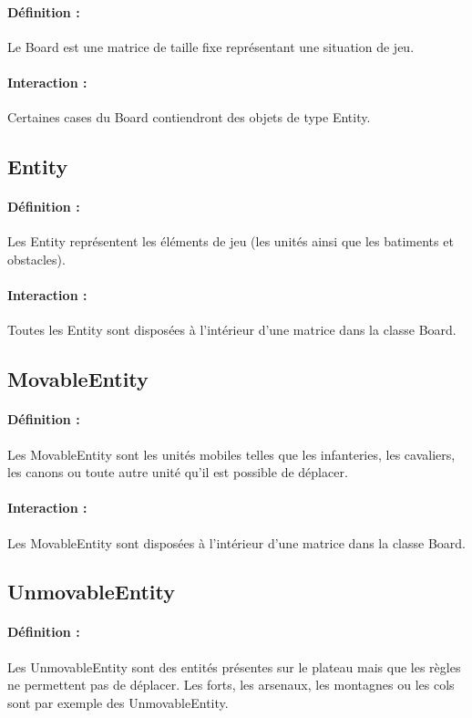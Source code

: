 			\paragraph{Définition :}
			Le Board est une matrice de taille fixe représentant une situation de jeu.
			\paragraph{Interaction :}
			Certaines cases du Board contiendront des objets de type Entity.

		\subsection*{Entity}

			\paragraph{Définition :}
			Les Entity représentent les éléments de jeu (les unités ainsi que les batiments et obstacles).
			\paragraph{Interaction :}
			Toutes les Entity sont disposées à l'intérieur d'une matrice dans la classe Board.

		\subsection*{MovableEntity}

			\paragraph{Définition :}
			Les MovableEntity sont les unités mobiles telles que les infanteries, les cavaliers, les canons ou toute autre unité 
			qu'il est possible de déplacer.
			\paragraph{Interaction :}
			Les MovableEntity sont disposées à l'intérieur d'une matrice dans la classe Board.

		\subsection*{UnmovableEntity}

			\paragraph{Définition :}
			Les UnmovableEntity sont des entités présentes sur le plateau mais que les règles ne permettent pas de déplacer. 
			Les forts, les arsenaux, les montagnes ou les cols sont par exemple des UnmovableEntity.
